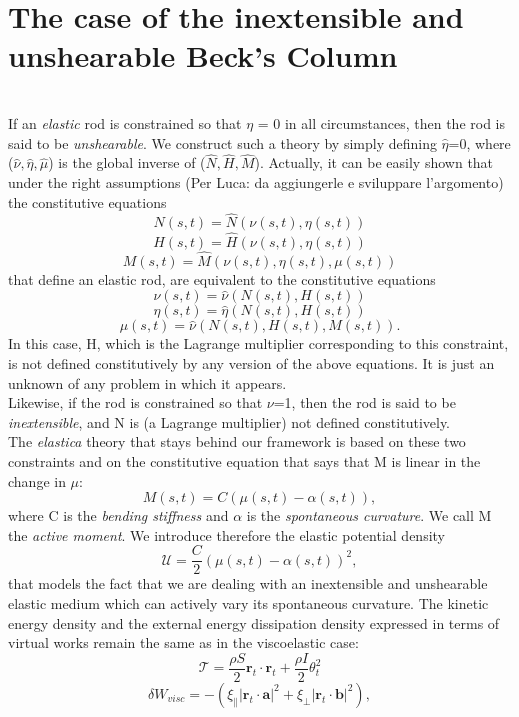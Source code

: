 
\section{The case of the inextensible and unshearable Beck's Column}

\\
If an \emph{elastic} rod is constrained so that $\eta$ = 0 in all circumstances, then the rod is said to be \emph{unshearable}.
We construct such a theory by simply defining $\hat{\eta}$=0, where ($\hat{\nu},\hat{\eta},\hat{\mu}$) is the global inverse of ($\hat{N},\hat{H},\hat{M}$). Actually, it can be easily shown that under the right assumptions (Per Luca: da aggiungerle e sviluppare l'argomento) the constitutive equations 
\[  N (s,t)=  \hat{N}(\nu (s,t),\eta (s,t))
\]
\[  H (s,t)=  \hat{H}(\nu (s,t),\eta (s,t)) 
\]
\[  M (s,t)=  \hat{M}(\nu (s,t),\eta (s,t), \mu(s,t))
\]
that define an elastic rod, are equivalent to the constitutive equations
\[  \nu (s,t)=  \hat{\nu}(N(s,t),H(s,t))
\]
\[  \eta (s,t)=  \hat{\eta}(N(s,t),H(s,t)) 
\]
\[  \mu (s,t)=  \hat{\nu}(N(s,t), H(s,t), M(s,t)).
\]
In this case, H, which is the Lagrange multiplier corresponding to this constraint, is not defined constitutively by any version of the above equations. It is just an unknown of any problem in which it appears.
\\
Likewise, if the rod is constrained so that $\nu$=1, then the rod is said to be \emph{inextensible}, and N is (a Lagrange multiplier) not defined constitutively.\\
The \emph{elastica} theory that stays behind our framework is based on these two constraints and on the constitutive equation that says that M is linear in the change in $\mu$:
\[
M(s,t) = C(\mu(s,t) − \alpha(s,t)),
\]
where C is the \emph{bending stiffness} and $\alpha$ is the \emph{spontaneous curvature}. We call M the \emph{active moment}. We introduce therefore the elastic potential density 
\[ \mathcal{U} = \frac{C}{2}(\mu(s,t) − \alpha(s,t))^2,\]
that models the fact that we are dealing with an inextensible and unshearable elastic medium which can actively vary its spontaneous curvature.
The kinetic energy density and the external energy dissipation density expressed in terms of virtual works remain the same as in the viscoelastic case:
\[
\mathcal{T} = \frac{\rho S}{2}\mathbf{r}_t \cdot \mathbf{r}_t + \frac{\rho I}{2}\theta_t^2
\]
\[ 
\delta W_{visc}= -(\xi_\parallel\left|\mathbf{r}_t\cdot\mathbf{a}\right|^2 + \xi_\perp \left|\mathbf{r}_t\cdot\mathbf{b}\right|^2),
\]


